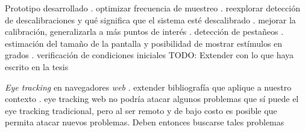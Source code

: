 \documentclass{beamer}
\begin{document}
\begin{frame}{Prototipo desarrollado}
. optimizar frecuencia de muestreo
. reexplorar detección de descalibraciones y qué significa que el sistema esté
  descalibrado
. mejorar la calibración, generalizarla a más puntos de interés
. detección de pestañeos
. estimación del tamaño de la pantalla y posibilidad de mostrar estímulos en
  grados
. verificación de condiciones iniciales
TODO: Extender con lo que haya escrito en la tesis
\end{frame}

\begin{frame}{\textit{Eye tracking} en navegadores \textit{web}}
. extender bibliografía que aplique a nuestro contexto
. eye tracking web no podría atacar algunos problemas que sí puede el eye
  tracking tradicional, pero al ser remoto y de bajo costo es posible que
  permita atacar nuevos problemas. Deben entonces buscarse tales problemas
\end{frame}
\end{document}
